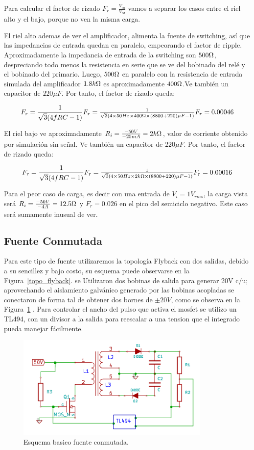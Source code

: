 Para calcular el factor de rizado $F_r=\frac{V_{ca}}{V_{cd}}$ vamos a separar los casos entre el riel alto y el bajo, porque no ven la misma carga.

El riel alto ademas de ver el amplificador, alimenta la fuente de switching, así que las impedancias de entrada quedan en paralelo, empeorando el factor de ripple. Aproximadamente la impedancia de entrada de la switching son $500\ohm$, despreciando todo menos la resistencia en serie que se ve del bobinado del relé y el bobinado del primario. Luego, $500\ohm$ en paralelo con la resistencia de entrada simulada del amplificador $1.8k\ohm$ es aproximadamente $400\ohm$.Ve también un capacitor de $220{\mu}F$.
Por tanto, el factor de rizado queda:

\[
	F_r=\frac{1}{\sqrt{3}(4fRC-1)}$$
$$	F_r=\frac{1}{\sqrt{3}(4\times 50Hz\times 400\ohm\times (8800+220){\mu}F-1)}$$
$$	F_r=0.00046
\]

El riel bajo ve aproximadamente $R_i=\frac{-50V}{-25mA}=2k\ohm$, valor de corriente obtenido por simulación sin señal. Ve también un capacitor de $220{\mu}F$.
Por tanto, el factor de rizado queda:

\[
	F_r=\frac{1}{\sqrt{3}(4fRC-1)}$$
$$	F_r=\frac{1}{\sqrt{3}(4\times 50Hz\times 2k\ohm\times (8800+220){\mu}F-1)}$$
$$	F_r=0.00016
\]

Para el peor caso de carga, es decir con una entrada de $V_i=1V_{rms}$, la carga vista será $R_i=\frac{-50V}{-4A}=12.5\ohm$ y $F_r=0.026$ en el pico del semiciclo negativo. Este caso será sumamente inusual de ver.
\medskip
\subsection{Fuente Conmutada}

Para este tipo de fuente utilizaremos la topología Flyback con dos salidas, debido a su sencillez y bajo costo, su esquema puede observarse en la Figura~\ref{topo_flyback}. se Utilizaron dos bobinas de salida para generar 20V c/u; aprovechando el aislamiento galvánico generado por las bobinas acopladas se conectaron de forma tal de obtener dos bornes de $\pm 20V$, como se observa en la Figura~\ref{conmutada_basica} . Para controlar el ancho del pulso que activa el mosfet se utilizo un TL494, con un divisor a la salida para reescalar a una tension que el integrado pueda manejar fácilmente.

\begin{figure}[H]
\centering
\includegraphics[width=0.85\textwidth]{img/conmutada_basica.png}
\caption{Esquema  basico fuente conmutada.}
\label{conmutada_basica}
\end{figure}
\medskip
